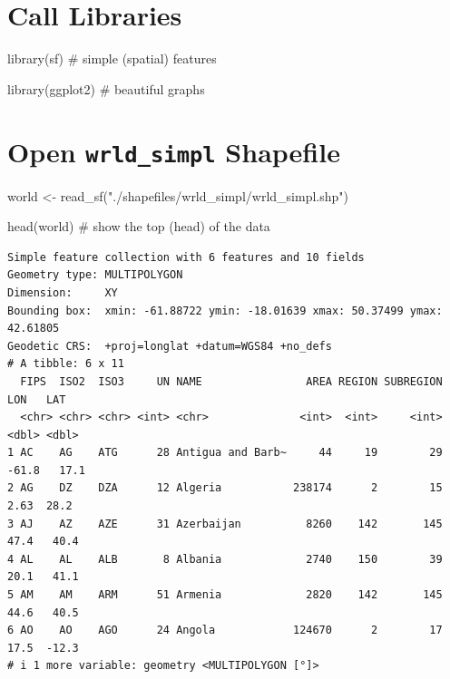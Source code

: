 \documentclass[
  letterpaper,
  DIV=11,
  numbers=noendperiod,
  oneside]{scrreprt}
\newenvironment{Shaded}{\begin{snugshade}}{\end{snugshade}}
\newcommand{\CommentTok}[1]{\textcolor[rgb]{0.37,0.37,0.37}{#1}}
\newcommand{\FunctionTok}[1]{\textcolor[rgb]{0.28,0.35,0.67}{#1}}
\newcommand{\NormalTok}[1]{\textcolor[rgb]{0.00,0.23,0.31}{#1}}
\newcommand{\OtherTok}[1]{\textcolor[rgb]{0.00,0.23,0.31}{#1}}
\newcommand{\StringTok}[1]{\textcolor[rgb]{0.13,0.47,0.30}{#1}}
\begin{document}
\section{Call Libraries}\label{call-libraries}

\begin{Shaded}
\begin{Highlighting}[]
\FunctionTok{library}\NormalTok{(sf) }\CommentTok{\# simple (spatial) features}

\FunctionTok{library}\NormalTok{(ggplot2) }\CommentTok{\# beautiful graphs}
\end{Highlighting}
\end{Shaded}

\section{\texorpdfstring{Open \texttt{wrld\_simpl}
Shapefile}{Open wrld\_simpl Shapefile}}\label{open-wrld_simpl-shapefile}

\begin{Shaded}
\begin{Highlighting}[]
\NormalTok{world }\OtherTok{\textless{}{-}} \FunctionTok{read\_sf}\NormalTok{(}\StringTok{"./shapefiles/wrld\_simpl/wrld\_simpl.shp"}\NormalTok{)}
\end{Highlighting}
\end{Shaded}

\begin{Shaded}
\begin{Highlighting}[]
\FunctionTok{head}\NormalTok{(world) }\CommentTok{\# show the top (head) of the data}
\end{Highlighting}
\end{Shaded}

\begin{verbatim}
Simple feature collection with 6 features and 10 fields
Geometry type: MULTIPOLYGON
Dimension:     XY
Bounding box:  xmin: -61.88722 ymin: -18.01639 xmax: 50.37499 ymax: 42.61805
Geodetic CRS:  +proj=longlat +datum=WGS84 +no_defs
# A tibble: 6 x 11
  FIPS  ISO2  ISO3     UN NAME                AREA REGION SUBREGION    LON   LAT
  <chr> <chr> <chr> <int> <chr>              <int>  <int>     <int>  <dbl> <dbl>
1 AC    AG    ATG      28 Antigua and Barb~     44     19        29 -61.8   17.1
2 AG    DZ    DZA      12 Algeria           238174      2        15   2.63  28.2
3 AJ    AZ    AZE      31 Azerbaijan          8260    142       145  47.4   40.4
4 AL    AL    ALB       8 Albania             2740    150        39  20.1   41.1
5 AM    AM    ARM      51 Armenia             2820    142       145  44.6   40.5
6 AO    AO    AGO      24 Angola            124670      2        17  17.5  -12.3
# i 1 more variable: geometry <MULTIPOLYGON [°]>
\end{verbatim}
\end{document}
